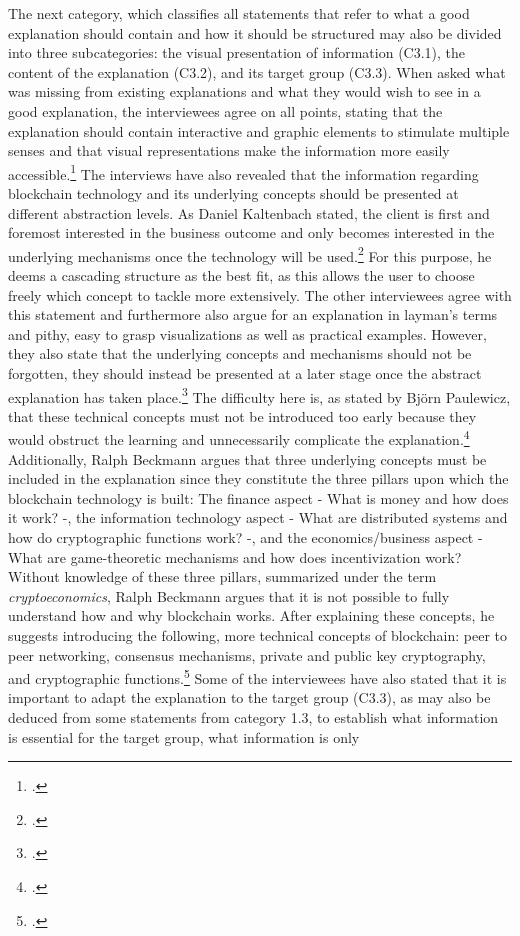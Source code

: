 The next category, which classifies all statements that refer to what a good explanation should contain and how it should be structured may also be divided into three subcategories: the visual presentation of information (C3.1), the content of the explanation (C3.2), and its target group (C3.3). When asked what was missing from existing explanations and what they would wish to see in a good explanation, the interviewees agree on all points, stating that the explanation should contain interactive and graphic elements to stimulate multiple senses and that visual representations make the information more easily accessible.\footcites[Cf.][P39, P40, P42]{DanielKaltenbach_Interview}[cf.][P82, P83, P84]{BjoernPaulewicz_Interview}[cf.][P123, P124, P134]{RalphBeckmann_Interview} The interviews have also revealed that the information regarding blockchain technology and its underlying concepts should be presented at different abstraction levels. As Daniel Kaltenbach stated, the client is first and foremost interested in the business outcome and only becomes interested in the underlying mechanisms once the technology will be used.\footcites[Cf.][P29, P30, P31, P32]{DanielKaltenbach_Interview} For this purpose, he deems a cascading structure as the best fit, as this allows the user to choose freely which concept to tackle more extensively. The other interviewees agree with this statement and furthermore also argue for an explanation in layman's terms and pithy, easy to grasp visualizations as well as practical examples. However, they also state that the underlying concepts and mechanisms should not be forgotten, they should instead be presented at a later stage once the abstract explanation has taken place.\footcites[Cf.][P51, P52, P55, P56]{DanielKaltenbach_Interview}[cf.][P78, P85, P86]{BjoernPaulewicz_Interview}[cf.][P125, P128]{RalphBeckmann_Interview} The difficulty here is, as stated by Björn Paulewicz, that these technical concepts must not be introduced too early because they would obstruct the learning and unnecessarily complicate the explanation.\footcites[Cf.][P88, P89]{BjoernPaulewicz_Interview} Additionally, Ralph Beckmann argues that three underlying concepts must be included in the explanation since they constitute the three pillars upon which the blockchain technology is built: The finance aspect - What is money and how does it work? -, the information technology aspect - What are distributed systems and how do cryptographic functions work? -, and the economics/business aspect - What are game-theoretic mechanisms and how does incentivization work? Without knowledge of these three pillars, summarized under the term \textit{cryptoeconomics}, Ralph Beckmann argues that it is not possible to fully understand how and why blockchain works. After explaining these concepts, he suggests introducing the following, more technical concepts of blockchain: peer to peer networking, consensus mechanisms, private and public key cryptography, and cryptographic functions.\footcites[Cf.][P126, P132]{RalphBeckmann_Interview} Some of the interviewees have also stated that it is important to adapt the explanation to the target group (C3.3), as may also be deduced from some statements from category 1.3, to establish what information is essential for the target group, what information is only 